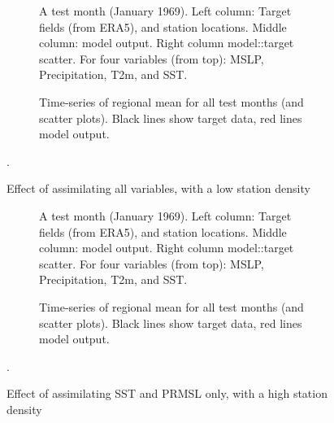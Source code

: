 \documentclass[a4paper,12pt]{article}
\begin{document}
     
\pagebreak
\begin{figure}[h]
\begin{subfigure}{1.0\textwidth}    
\caption{A test month (January 1969). Left column: Target fields (from ERA5), and station locations. Middle column: model output. Right column model::target scatter. For four variables (from top): MSLP, Precipitation, T2m, and SST.}
\end{subfigure}
\begin{subfigure}{1.0\textwidth}    
\caption{Time-series of regional mean for all test months (and scatter plots). Black lines show target data, red lines model output.}
\end{subfigure}
\caption{Effect of assimilating all variables, with a low station density}.
\label{All_20}
\end{figure}

    
\pagebreak
\begin{figure}[h]
\begin{subfigure}{1.0\textwidth}    
\caption{A test month (January 1969). Left column: Target fields (from ERA5), and station locations. Middle column: model output. Right column model::target scatter. For four variables (from top): MSLP, Precipitation, T2m, and SST.}
\end{subfigure}
\begin{subfigure}{1.0\textwidth}    
\caption{Time-series of regional mean for all test months (and scatter plots). Black lines show target data, red lines model output.}
\end{subfigure}
\caption{Effect of assimilating SST and PRMSL only, with a high station density}.
\label{SST+PRMSL_05}
\end{figure}
\end{document}
